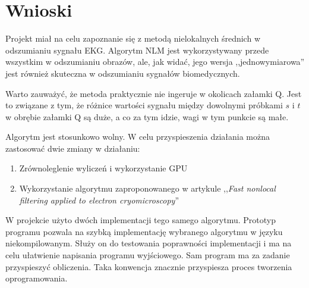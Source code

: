 \section{Wnioski}

Projekt miał na celu zapoznanie się z metodą nielokalnych średnich w odszumianiu sygnału EKG. Algorytm NLM jest wykorzystywany przede wszystkim w odszumianiu obrazów, ale, jak widać, jego wersja ,,jednowymiarowa'' jest również skuteczna w odszumianiu sygnałów biomedycznych.

Warto zauważyć, że metoda praktycznie nie ingeruje w okolicach załamki Q. Jest to związane z tym, że różnice wartości sygnału między dowolnymi próbkami $s$ i $t$ w obrębie załamki Q są duże, a co za tym idzie, wagi w tym punkcie są małe.

Algorytm jest stosunkowo wolny. W celu przyspieszenia działania można zastosować dwie zmiany w działaniu:
\begin{enumerate}
	\item Zrównoleglenie wyliczeń i wykorzystanie GPU
	\item Wykorzystanie algorytmu zaproponowanego w artykule ,,\textit{Fast nonlocal filtering applied to electron cryomicroscopy}''\cite{DarbonCCOJ08}
\end{enumerate} 

W projekcie użyto dwóch implementacji tego samego algorytmu. Prototyp programu pozwala na szybką implementację wybranego algorytmu w języku niekompilowanym. Służy on do testowania poprawności implementacji i ma na celu ułatwienie napisania programu wyjściowego. Sam program ma za zadanie przyspieszyć obliczenia. Taka konwencja znacznie przyspiesza proces tworzenia oprogramowania.